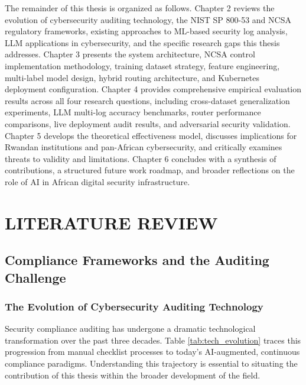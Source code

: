\documentclass[12pt,oneside]{report}
\begin{document}
The remainder of this thesis is organized as follows. Chapter 2 reviews the evolution of cybersecurity auditing technology, the NIST SP 800-53 and NCSA regulatory frameworks, existing approaches to ML-based security log analysis, LLM applications in cybersecurity, and the specific research gaps this thesis addresses. Chapter 3 presents the system architecture, NCSA control implementation methodology, training dataset strategy, feature engineering, multi-label model design, hybrid routing architecture, and Kubernetes deployment configuration. Chapter 4 provides comprehensive empirical evaluation results across all four research questions, including cross-dataset generalization experiments, LLM multi-log accuracy benchmarks, router performance comparisons, live deployment audit results, and adversarial security validation. Chapter 5 develops the theoretical effectiveness model, discusses implications for Rwandan institutions and pan-African cybersecurity, and critically examines threats to validity and limitations. Chapter 6 concludes with a synthesis of contributions, a structured future work roadmap, and broader reflections on the role of AI in African digital security infrastructure.

\chapter{LITERATURE REVIEW}

\section{Compliance Frameworks and the Auditing Challenge}

\subsection{The Evolution of Cybersecurity Auditing Technology}

Security compliance auditing has undergone a dramatic technological transformation over the past three decades. Table \ref{tab:tech_evolution} traces this progression from manual checklist processes to today's AI-augmented, continuous compliance paradigms. Understanding this trajectory is essential to situating the contribution of this thesis within the broader development of the field.
\end{document}
